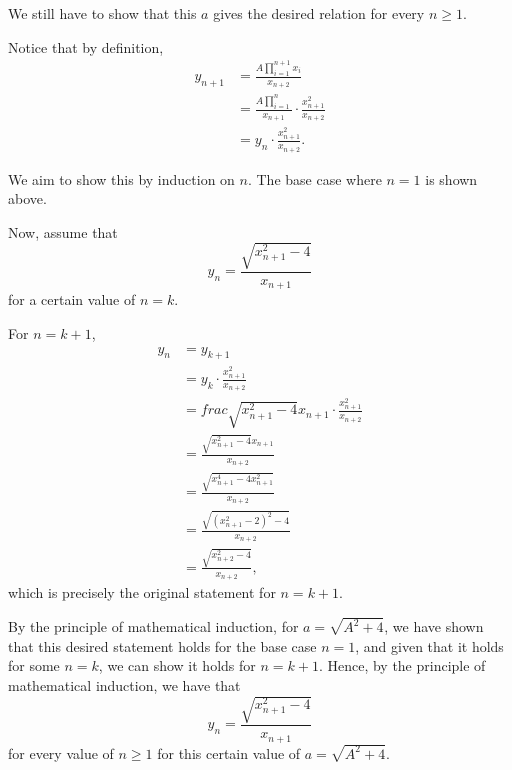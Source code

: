 \begin{enumerate}
          We still have to show that this \(a\) gives the desired relation for every \(n \geq 1\).

          Notice that by definition,
          \begin{align*}
              y_{n + 1} & = \frac{A \prod_{i = 1}^{n + 1} x_i}{x_{n + 2}}                             \\
                        & = \frac{A \prod_{i = 1}^{n}}{x_{n + 1}} \cdot \frac{x_{n + 1}^2}{x_{n + 2}} \\
                        & = y_{n} \cdot \frac{x_{n + 1}^2}{x_{n + 2}}.
          \end{align*}

          We aim to show this by induction on \(n\). The base case where \(n = 1\) is shown above.

          Now, assume that
          \[
              y_n = \frac{\sqrt{x_{n + 1}^2 - 4}}{x_{n + 1}}
          \]
          for a certain value of \(n = k\).

          For \(n = k + 1\),
          \begin{align*}
              y_n & = y_{k + 1}                                                                   \\
                  & = y_k \cdot \frac{x_{n + 1}^2}{x_{n + 2}}                                     \\
                  & = frac{\sqrt{x_{n + 1}^2 - 4}}{x_{n + 1}} \cdot \frac{x_{n + 1}^2}{x_{n + 2}} \\
                  & = \frac{\sqrt{x_{n + 1}^2 - 4} x_{n + 1}}{x_{n + 2}}                          \\
                  & = \frac{\sqrt{x_{n + 1}^4 - 4 x_{n + 1}^2}}{x_{n + 2}}                        \\
                  & = \frac{\sqrt{\left(x_{n + 1}^2 - 2\right)^2 - 4}}{x_{n + 2}}                 \\
                  & = \frac{\sqrt{x_{n + 2}^2 - 4}}{x_{n + 2}},
          \end{align*}
          which is precisely the original statement for \(n = k + 1\).

          By the principle of mathematical induction, for \(a = \sqrt{A^2 + 4}\), we have shown that this desired statement holds for the base case \(n = 1\), and given that it holds for some \(n = k\), we can show it holds for \(n = k + 1\). Hence, by the principle of mathematical induction, we have that
          \[
              y_n = \frac{\sqrt{x_{n + 1}^2 - 4}}{x_{n + 1}}
          \]
          for every value of \(n \geq 1\) for this certain value of \(a = \sqrt{A^2 + 4}\).


\end{enumerate}
